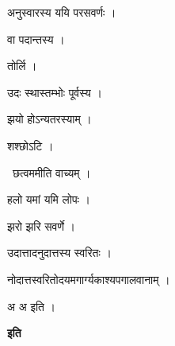 \documentclass[10pt, openany, oneside]{book}
\begin{document}
\noindent अनुस्वारस्य ययि परसवर्णः ।

\noindent वा पदान्तस्य ।

\noindent तोर्लि ।

\noindent उदः स्थास्तम्भोः पूर्वस्य ।

\noindent झयो होऽन्यतरस्याम् ।

\noindent शश्छोऽटि ।

\par\noindent\hspace{1.5em}{\vps वा॰}~{\qt छत्वममीति वाच्यम् ।}

\noindent हलो यमां यमि लोपः ।

\noindent झरो झरि सवर्णे ।

\noindent उदात्तादनुदात्तस्य स्वरितः ।

\noindent नोदात्तस्वरितोदयमगार्ग्यकाश्यपगालवानाम् ।

\noindent अ अ इति ।

\begin{center}\textbf{इति}\end{center}
\end{document}
